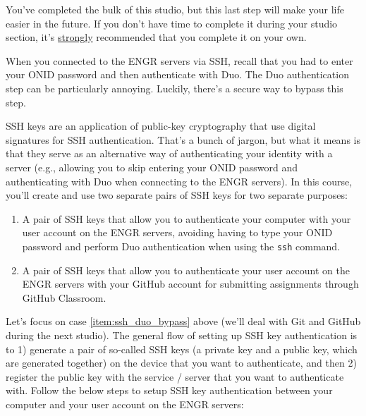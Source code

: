 \documentclass{article}
\begin{document}
You've completed the bulk of this studio, but this last step will make your life easier in the future. If you don't have time to complete it during your studio section, it's \ul{strongly} recommended that you complete it on your own.

When you connected to the ENGR servers via SSH, recall that you had to enter your ONID password and then authenticate with Duo. The Duo authentication step can be particularly annoying. Luckily, there's a secure way to bypass this step.

SSH keys are an application of public-key cryptography that use digital signatures for SSH authentication. That's a bunch of jargon, but what it means is that they serve as an alternative way of authenticating your identity with a server (e.g., allowing you to skip entering your ONID password and authenticating with Duo when connecting to the ENGR servers). In this course, you'll create and use two separate pairs of SSH keys for two separate purposes:

\begin{enumerate}
    \item \label{item:ssh_duo_bypass} A pair of SSH keys that allow you to authenticate your computer with your user account on the ENGR servers, avoiding having to type your ONID password and perform Duo authentication when using the \texttt{ssh} command.
    \item A pair of SSH keys that allow you to authenticate your user account on the ENGR servers with your GitHub account for submitting assignments through GitHub Classroom.
\end{enumerate}

Let's focus on case \ref{item:ssh_duo_bypass} above (we'll deal with Git and GitHub during the next studio). The general flow of setting up SSH key authentication is to 1) generate a pair of so-called SSH keys (a private key and a public key, which are generated together) on the device that you want to authenticate, and then 2) register the public key with the service / server that you want to authenticate with. Follow the below steps to setup SSH key authentication between your computer and your user account on the ENGR servers:
\end{document}
